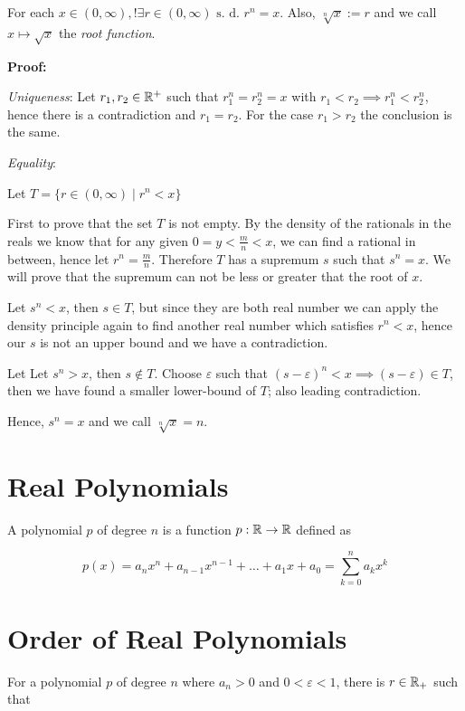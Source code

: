 For each \(x \in (0, \infty), !\exists  r \in (0, \infty) \text{ s. d. } r^n  =x\). Also, \(\sqrt[n]{x}:= r\) and we call \(x \mapsto \sqrt{x}\) the \emph{root function}.

\textbf{Proof:}

\emph{Uniqueness}: Let \(r_1, r_2 \in \mathbb{R}^{+}\) such that \(r_1^n = r_2^n = x\) with \(r_1 < r_2 \implies r_1^n < r_2^n\), hence there
is a contradiction and \(r_1 = r_2\). For the case \(r_1 > r_2\) the conclusion is the same.

\emph{Equality}:

Let \(T = \{r \in (0, \infty) \mid r^n < x\}\)

First to prove that the set \(T\) is not empty. By the density of the rationals in the reals we know that
for any given \(0 = y < \frac{m}{n} < x\), we can find a rational in between, hence let \(r^n = \frac{m}{n}\).
Therefore \(T\) has a supremum \(s\) such that \(s^n = x\). We will prove that the supremum can not be less or greater that the root
of \(x\).

Let \(s^n < x\), then \(s \in T\), but since they are both real number we can apply the density principle again to find another
real number which satisfies \(r^n < x\), hence our \(s\) is not an upper bound and we have a contradiction.

Let Let \(s^n > x\), then \(s \notin T\). Choose \(\varepsilon\) such that \((s - \varepsilon)^n < x \implies (s - \varepsilon) \in T\), then we have
found a smaller lower-bound of \(T\); also leading contradiction.

Hence, \(s^n = x\) and we call \(\sqrt[n]{x} = n\).


\QED

\section{Real Polynomials}

A polynomial \(p\) of degree \(n\) is a function \(p: \mathbb{R} \to \mathbb{R}\) defined as

\[
	p(x) = a_n x^n + a_{n - 1} x^{n - 1} + \ldots + a_1 x + a_0 = \sum_{k = 0}^{n} a_k x^k
\]

\section{Order of Real Polynomials}

For a polynomial \(p\) of degree \(n\) where \(a_n > 0\) and \(0 < \varepsilon < 1\), there is
\(r \in \mathbb{R}_+\) such that


